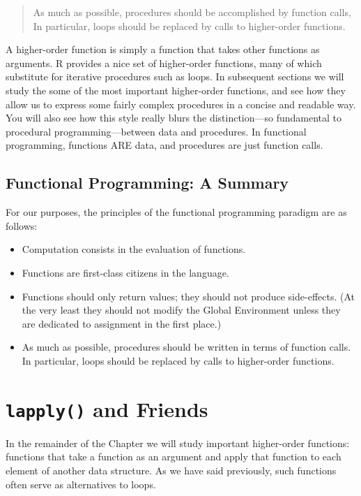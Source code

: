\documentclass[]{book}
\providecommand{\tightlist}{%
  \setlength{\itemsep}{0pt}\setlength{\parskip}{0pt}}
\theoremstyle{definition}
\theoremstyle{definition}
\theoremstyle{definition}
\theoremstyle{remark}
\begin{document}
{\begin{quote}
As much as possible, procedures should be accomplished by function
calls, In particular, loops should be replaced by calls to higher-order
functions.
\end{quote}

A higher-order function is simply a function that takes other functions
as arguments. R provides a nice set of
higher-order functions, many of which substitute for iterative
procedures such as loops. In subsequent sections we will study the some
of the most important higher-order functions, and see how they allow us
to express some fairly complex procedures in a concise and readable way.
You will also see how this style really blurs the distinction---so
fundamental to procedural programming---between data and procedures. In
functional programming, functions ARE data, and procedures are just
function calls.

\subsection{Functional Programming: A
Summary}\label{functional-programming-a-summary}

For our purposes, the principles of the functional programming paradigm
are as follows:

\begin{itemize}
\tightlist
\item
  Computation consists in the evaluation of functions.
\item
  Functions are first-class citizens in the language.
\item
  Functions should only return values; they should not produce
  side-effects. (At the very least they should not modify the Global
  Environment unless they are dedicated to assignment in the first
  place.)
\item
  As much as possible, procedures should be written in terms of function
  calls. In particular, loops should be replaced by calls to
  higher-order functions.
\end{itemize}

\section{\texorpdfstring{\texttt{lapply()} and
Friends}{lapply() and Friends}}\label{lapply-and-friends}

In the remainder of the Chapter we will study important higher-order
functions: functions that take a function as an argument and apply that
function to each element of another data structure. As we have said
previously, such functions often serve as alternatives to loops.

}
\end{document}
